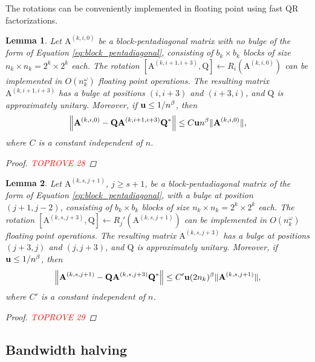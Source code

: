 \documentclass{article}
\newcommand{\lnorm}{\left\|}
\newcommand{\rnorm}{\right\|}
\newtheorem{lemma}{Lemma}[section]
\newcommand\matA{\boldsymbol{\mathrm{A}}}
\newcommand\matQ{\boldsymbol{\mathrm{Q}}}
\newcommand{\umach}{\textbf{\textup{u}}}
\newcommand{\cmm}{\beta}
\begin{document}
The rotations can be conveniently implemented in floating point using fast QR factorizations.

\begin{lemma}
    \label{lemma:rotation_r_i_floating_point}
    Let $\matA^{(k,i,0)}$ be a block-pentadiagonal matrix with no bulge of the form of Equation \eqref{eq:block_pentadiagonal}, consisting of $b_k\times b_k$ blocks of size $n_k\times n_k=2^{k}\times 2^{k}$ each. The rotation $[\matA^{(k,i+1,i+3)},\matQ] \leftarrow R_i(\matA^{(k,i,0)})$ can be implemented in $O(n_k^{\omega})$ floating point operations. The resulting matrix $\matA^{(k,i+1,i+3)}$ has a bulge at positions $(i,i+3)$ and $(i+3,i)$, and $\matQ$ is approximately unitary. Moreover, if $\umach\leq 1/n^{\cmm}$, then
    \begin{align*}
        \lnorm 
            \matA^{(k,i,0)} - \matQ\matA^{(k,i+1,i+3)} \matQ^*
        \rnorm
        \leq
        C\umach n^{\cmm}\|\matA^{(k,i,0)}\|,
    \end{align*}
    where $C$ is a constant independent of $n$.
    \begin{proof}\textcolor{red}{TOPROVE 28}\end{proof}
\end{lemma}


\begin{lemma}
    \label{lemma:rotation_r_i_prime_floating_point}
    Let $\matA^{(k,s,j+1)}$, $j\geq s+1$, be a block-pentadiagonal matrix of the form of Equation \eqref{eq:block_pentadiagonal}, with a bulge at position $(j+1,j-2)$, consisting of $b_k\times b_k$ blocks of size $n_k\times n_k=2^{k}\times 2^{k}$ each. The rotation $[\matA^{(k,s,j+3)},\matQ] \leftarrow R_j'(\matA^{(k,s,j+1)})$ can be implemented in $O(n_k^{\omega})$ floating point operations. The resulting matrix $\matA^{(k,s,j+3)}$ has a bulge at positions $(j+3,j)$ and $(j,j+3)$, and $\matQ$ is approximately unitary. Moreover, if $\umach\leq 1/n^{\cmm}$, then
    \begin{align*}
        \lnorm 
            \matA^{(k,s,j+1)} - \matQ\matA^{(k,s,j+3)} \matQ^*
        \rnorm
        \leq
        C'\umach (2n_k)^{\cmm}\|\matA^{(k,s,j+1)}\|,
    \end{align*}
    where $C'$ is a constant independent of $n$.
    \begin{proof}\textcolor{red}{TOPROVE 29}\end{proof}
\end{lemma}


\subsection{Bandwidth halving}
\end{document}
